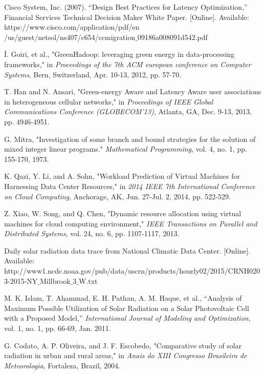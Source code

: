 \documentclass[journal,12pt,draftclsnofoot,onecolumn]{IEEEtran}
\begin{document}
\begin{thebibliography}{15}
Cisco System, Inc. (2007). “Design Best Practices for Latency Optimization,” Financial Services Technical Decision Maker White Paper. [Online]. Available: https://www.cisco.com/application/pdf/en /us/guest/netsol/ns407/c654/ccmigration$\_$09186a008091d542.pdf

Í. Goiri, et al., "GreenHadoop: leveraging green energy in data-processing frameworks," in \emph{Proceedings of the 7th ACM european conference on Computer Systems}, Bern, Switzerland, Apr. 10-13, 2012, pp. 57-70.

T. Han and N. Ansari, "Green-energy Aware and Latency Aware user associations in heterogeneous cellular networks," in \emph{Proceedings of IEEE Global Communications Conference (GLOBECOM'13)}, Atlanta, GA, Dec. 9-13, 2013, pp. 4946-4951.

G. Mitra, "Investigation of some branch and bound strategies for the solution of mixed integer linear programs." \emph{Mathematical Programming}, vol. 4, no. 1, pp. 155-170, 1973.

K. Qazi, Y. Li, and A. Sohn, "Workload Prediction of Virtual Machines for Harnessing Data Center Resources," in \emph{2014 IEEE 7th International Conference on Cloud Computing}, Anchorage, AK, Jun. 27-Jul. 2, 2014, pp. 522-529.

Z. Xiao, W. Song, and Q. Chen, "Dynamic resource allocation using virtual machines for cloud computing environment," \emph{IEEE Transactions on Parallel and Distributed Systems}, vol. 24, no. 6, pp. 1107-1117, 2013.

Daily solar radiation data trace from National Climatic Data Center. [Online]. Available: http://www1.ncdc.noaa.gov/pub/data/uscrn/products/hourly02/2015/CRNH0203-2015-NY$\_$Millbrook$\_$3$\_$W.txt

M. K. Islam, T. Ahammad, E. H. Pathan, A. M. Haque, et al., “Analysis of Maximum Possible Utilization of Solar Radiation on a Solar Photovoltaic Cell with a Proposed Model,” \emph{International Journal of Modeling and Optimization}, vol. 1, no. 1, pp. 66-69, Jan. 2011.

G. Codato, A. P. Oliveira, and J. F. Escobedo, "Comparative study of solar radiation in urban and rural areas," in \emph{Anais do XIII Congresso Brasileiro de Meteorologia}, Fortaleza, Brazil, 2004. 
  
\end{thebibliography}
\end{document}
